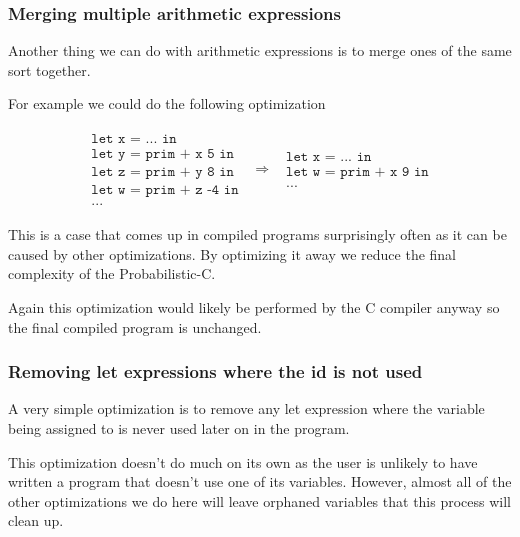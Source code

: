 \documentclass[a4paper]{article}
\newcommand{\optimization}[2]{
	\[
		\begin{array}{rcl}
			#1 & \Rightarrow & #2
		\end{array}
	\]
}
\begin{document}
\subsubsection{Merging multiple arithmetic expressions}

Another thing we can do with arithmetic expressions is to merge ones of the same sort together.

For example we could do the following optimization
\optimization{
	\begin{array}{l}
		\texttt{let x = ... in} \\
		\texttt{let y = prim + x 5 in} \\
		\texttt{let z = prim + y 8 in} \\
		\texttt{let w = prim + z -4 in} \\
		\texttt{...}
	\end{array}
}{
	\begin{array}{l}
		\texttt{let x = ... in} \\
		\texttt{let w = prim + x 9 in} \\
		\texttt{...}
	\end{array}
}
This is a case that comes up in compiled programs surprisingly often as it can be caused by other optimizations. By optimizing it away we reduce the final complexity of the Probabilistic-C.

Again this optimization would likely be performed by the C compiler anyway so the final compiled program is unchanged.




\subsubsection{Removing let expressions where the id is not used}

A very simple optimization is to remove any let expression where the variable being assigned to is never used later on in the program.

This optimization doesn't do much on its own as the user is unlikely to have written a program that doesn't use one of its variables. However, almost all of the other optimizations we do here will leave orphaned variables that this process will clean up.
\end{document}
